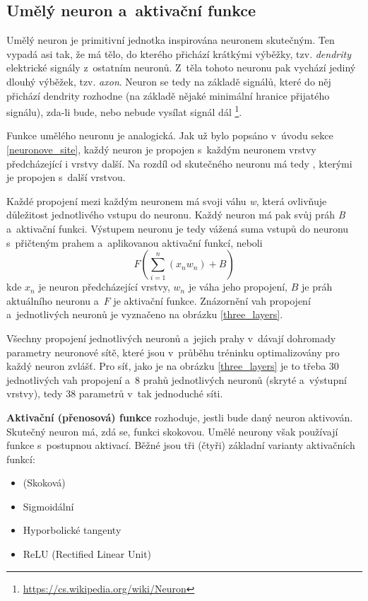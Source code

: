 \subsection{Umělý neuron a~aktivační funkce}
Umělý neuron je primitivní jednotka inspirována neuronem skutečným. Ten vypadá asi tak, že má tělo, do kterého přichází krátkými výběžky, tzv. \emph{dendrity} elektrické signály z~ostatním neuronů. Z~těla tohoto neuronu pak vychází jediný dlouhý výběžek, tzv. \emph{axon}. Neuron se tedy na základě signálů, které do něj přichází dendrity rozhodne (na základě nějaké minimální hranice přijatého signálu), zda-li bude, nebo nebude vysílat signál dál \footnote{\url{https://cs.wikipedia.org/wiki/Neuron}}.\par
Funkce umělého neuronu je analogická. Jak už bylo popsáno v~úvodu sekce \ref{neuronove_site}, každý neuron je propojen s~každým neuronem vrstvy předcházející i vrstvy další. Na rozdíl od skutečného neuronu má tedy , kterými je propojen s~další vrstvou.\par
Každé propojení mezi každým neuronem má svoji váhu \emph{w}, která ovlivňuje důležitost jednotlivého vstupu do neuronu. Každý neuron má pak svůj práh \emph{B} a~aktivační funkci. Výstupem neuronu je tedy vážená suma vstupů do neuronu s~přičteným prahem a~aplikovanou aktivační funkcí, neboli 
\begin{equation}
F({\sum_{i=1}^n ({x_n}w_n)} + B)
\end{equation}
kde $x_n$ je neuron předcházející vrstvy, $w_n$ je váha jeho propojení, $B$ je práh aktuálního neuronu a~$F$ je aktivační funkce. Znázornění vah propojení a~jednotlivých neuronů je vyznačeno na obrázku \ref{three_layers}.\par
Všechny propojení jednotlivých neuronů a~jejich prahy v~dávají dohromady parametry neuronové sítě, které jsou v~průběhu tréninku optimalizovány pro každý neuron zvlášť. Pro síť, jako je na obrázku \ref{three_layers} je to třeba 30 jednotlivých vah propojení a~8 prahů jednotlivých neuronů (skryté a~výstupní vrstvy), tedy 38 parametrů v~tak jednoduché síti.\par
\textbf{Aktivační (přenosová) funkce} rozhoduje, jestli bude daný neuron aktivován. Skutečný neuron má, zdá se, funkci skokovou. Umělé neurony však používají funkce s~postupnou aktivací. Běžné jsou tři (čtyři) základní varianty aktivačních funkcí: 

\begin{itemize}
    \item (Skoková)
    \item Sigmoidální
    \item Hyporbolické tangenty
    \item ReLU (Rectified Linear Unit)
\end{itemize}

